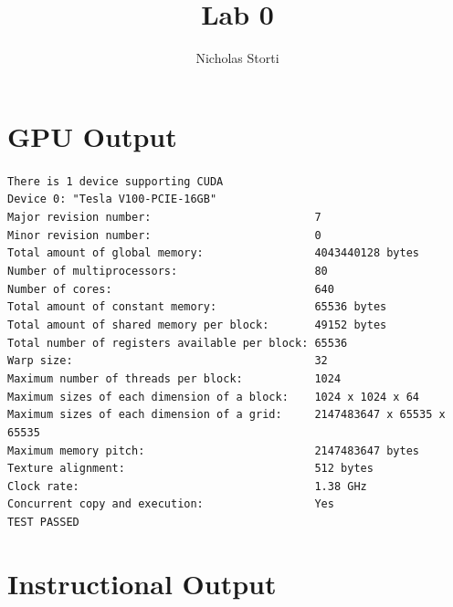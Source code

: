 \documentclass{article}
\title{Lab 0}
\author{Nicholas Storti}
\begin{document}
	\maketitle
	
	\section{GPU Output}
	\verb!There is 1 device supporting CUDA! \\
	
	\noindent \verb!Device 0: "Tesla V100-PCIE-16GB"! \\
	\verb!Major revision number:                         7! \\
	\verb!Minor revision number:                         0! \\
	\verb!Total amount of global memory:                 4043440128 bytes! \\
	\verb!Number of multiprocessors:                     80! \\
	\verb!Number of cores:                               640! \\
	\verb!Total amount of constant memory:               65536 bytes! \\
	\verb!Total amount of shared memory per block:       49152 bytes! \\
	\verb!Total number of registers available per block: 65536! \\
	\verb!Warp size:                                     32! \\
	\verb!Maximum number of threads per block:           1024! \\
	\verb!Maximum sizes of each dimension of a block:    1024 x 1024 x 64! \\
	\verb!Maximum sizes of each dimension of a grid:     2147483647 x 65535 x 65535! \\
	\verb!Maximum memory pitch:                          2147483647 bytes! \\
	\verb!Texture alignment:                             512 bytes! \\
	\verb!Clock rate:                                    1.38 GHz! \\
	\verb!Concurrent copy and execution:                 Yes! \\
	
	\noindent \verb!TEST PASSED!
	
	\section{Instructional Output}
	
\end{document}
